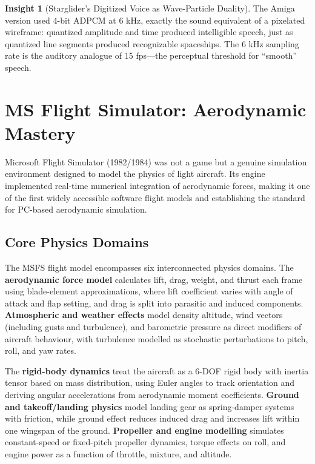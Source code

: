 \documentclass[11pt,a4paper]{article}
\theoremstyle{definition}
\newtheorem{insight}{Insight}[section]
\begin{document}
\begin{insight}[Starglider's Digitized Voice as Wave-Particle Duality]
The Amiga version used 4-bit ADPCM at 6 kHz, exactly the sound equivalent of a pixelated wireframe: quantized amplitude and time produced intelligible speech, just as quantized line segments produced recognizable spaceships. The 6 kHz sampling rate is the auditory analogue of 15 fps---the perceptual threshold for ``smooth'' speech.
\end{insight}

\section{MS Flight Simulator: Aerodynamic Mastery}\label{sec:msfs}

Microsoft Flight Simulator (1982/1984) was not a game but a genuine simulation environment designed to model the physics of light aircraft. Its engine implemented real-time numerical integration of aerodynamic forces, making it one of the first widely accessible software flight models and establishing the standard for PC-based aerodynamic simulation.

\subsection{Core Physics Domains}

The MSFS flight model encompasses six interconnected physics domains. The \textbf{aerodynamic force model} calculates lift, drag, weight, and thrust each frame using blade-element approximations, where lift coefficient varies with angle of attack and flap setting, and drag is split into parasitic and induced components. \textbf{Atmospheric and weather effects} model density altitude, wind vectors (including gusts and turbulence), and barometric pressure as direct modifiers of aircraft behaviour, with turbulence modelled as stochastic perturbations to pitch, roll, and yaw rates.

The \textbf{rigid-body dynamics} treat the aircraft as a 6-DOF rigid body with inertia tensor based on mass distribution, using Euler angles to track orientation and deriving angular accelerations from aerodynamic moment coefficients. \textbf{Ground and takeoff/landing physics} model landing gear as spring-damper systems with friction, while ground effect reduces induced drag and increases lift within one wingspan of the ground. \textbf{Propeller and engine modelling} simulates constant-speed or fixed-pitch propeller dynamics, torque effects on roll, and engine power as a function of throttle, mixture, and altitude.
\end{document}
